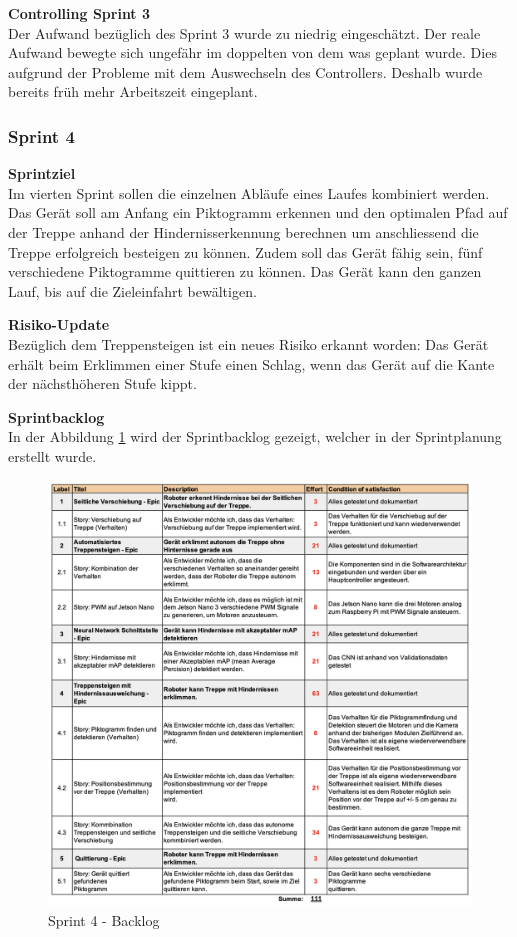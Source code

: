 \textbf{Controlling Sprint 3}\\
Der Aufwand bezüglich des Sprint 3 wurde zu niedrig eingeschätzt. Der reale Aufwand bewegte sich ungefähr im doppelten von dem was geplant wurde. Dies aufgrund der Probleme mit dem Auswechseln des Controllers. Deshalb wurde bereits früh mehr Arbeitszeit eingeplant.

\subsubsection{Sprint 4}
\textbf{Sprintziel}\\
Im vierten Sprint sollen die einzelnen Abläufe eines Laufes kombiniert werden. Das Gerät soll am Anfang ein Piktogramm erkennen und den optimalen Pfad auf der Treppe anhand der Hindernisserkennung berechnen um anschliessend die Treppe erfolgreich besteigen zu können. Zudem soll das Gerät fähig sein, fünf verschiedene Piktogramme quittieren zu können. Das Gerät kann den ganzen Lauf, bis auf die Zieleinfahrt bewältigen.

\textbf{Risiko-Update}\\
Bezüglich dem Treppensteigen ist ein neues Risiko erkannt worden:  Das Gerät erhält beim Erklimmen einer Stufe einen Schlag, wenn das Gerät auf die Kante der nächsthöheren Stufe kippt.

\textbf{Sprintbacklog}\\
In der Abbildung \ref{fig:sprint-backlog-4} wird der Sprintbacklog gezeigt, welcher in der Sprintplanung erstellt wurde.
\begin{figure}[H]
  \includegraphics[width=1.0\textwidth]{img/projektmanagement/Sprint 4.png}
  \centering
  \caption{Sprint 4 - Backlog}
  \label{fig:sprint-backlog-4}
\end{figure}

